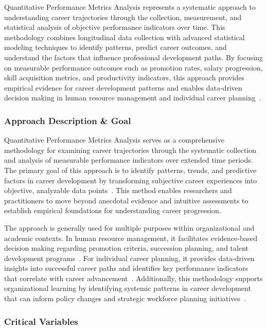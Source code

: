 \documentclass[main.tex]{subfiles}
\begin{document}
Quantitative Performance Metrics Analysis represents a systematic approach to understanding career trajectories through the collection, measurement, and statistical analysis of objective performance indicators over time. This methodology combines longitudinal data collection with advanced statistical modeling techniques to identify patterns, predict career outcomes, and understand the factors that influence professional development paths. By focusing on measurable performance outcomes such as promotion rates, salary progression, skill acquisition metrics, and productivity indicators, this approach provides empirical evidence for career development patterns and enables data-driven decision making in human resource management and individual career planning~\parencite{performance_iot,longitudinal_psico, beyond_numbers}.

\subsubsection{Approach Description \& Goal}

Quantitative Performance Metrics Analysis serves as a comprehensive methodology for examining career trajectories through the systematic collection and analysis of measurable performance indicators over extended time periods. The primary goal of this approach is to identify patterns, trends, and predictive factors in career development by transforming subjective career experiences into objective, analyzable data points~\parencite{performance_iot,longitudinal_psico}. This method enables researchers and practitioners to move beyond anecdotal evidence and intuitive assessments to establish empirical foundations for understanding career progression.

The approach is generally used for multiple purposes within organizational and academic contexts. In human resource management, it facilitates evidence-based decision making regarding promotion criteria, succession planning, and talent development programs~\parencite{career_path_ratio}. For individual career planning, it provides data-driven insights into successful career paths and identifies key performance indicators that correlate with career advancement~\parencite{quant_analyst_selby}. Additionally, this methodology supports organizational learning by identifying systemic patterns in career development that can inform policy changes and strategic workforce planning initiatives~\parencite{mcp_lessons}.

\subsubsection{Critical Variables}
\end{document}
